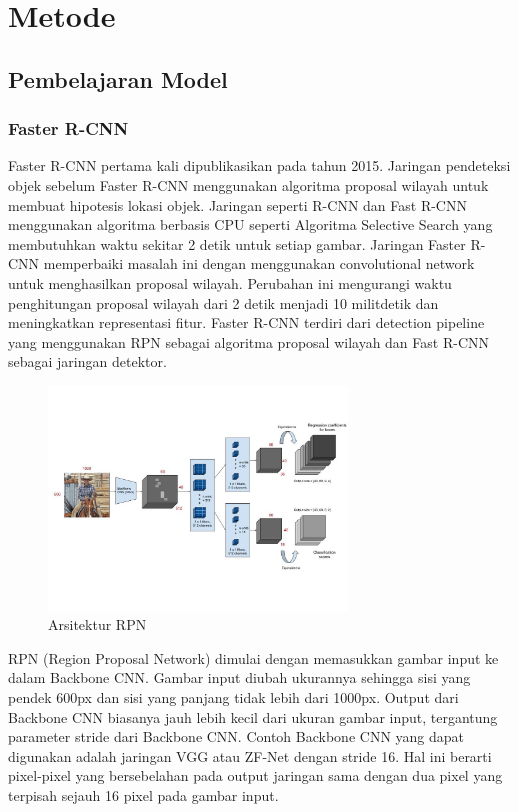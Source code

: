 \documentclass{article}
\begin{document}
  \section{Metode}
  	\subsection{Pembelajaran Model}
  	 \subsubsection{Faster R-CNN}
  	 \par Faster R-CNN pertama kali dipublikasikan pada tahun 2015. Jaringan pendeteksi objek sebelum Faster R-CNN menggunakan algoritma proposal wilayah untuk membuat hipotesis lokasi objek. Jaringan seperti R-CNN dan Fast R-CNN menggunakan algoritma berbasis CPU seperti Algoritma Selective Search yang membutuhkan waktu sekitar 2 detik untuk setiap gambar. Jaringan Faster R-CNN memperbaiki masalah ini dengan menggunakan convolutional network untuk menghasilkan proposal wilayah. Perubahan ini mengurangi waktu penghitungan proposal wilayah dari 2 detik menjadi 10 militdetik dan meningkatkan representasi fitur. Faster R-CNN terdiri dari detection pipeline yang menggunakan RPN sebagai algoritma proposal wilayah dan Fast R-CNN sebagai jaringan detektor.\cite{shilpa_2020}
  	 
  	 \begin{figure}[H]
  	 	\centering
  	 	\includegraphics[width=300px]{arsitektur/RPN.jpeg}
  	 	\caption{Arsitektur RPN}
  	 \end{figure}
   
  	 \par RPN (Region Proposal Network) dimulai dengan memasukkan gambar input ke dalam Backbone CNN. Gambar input diubah ukurannya sehingga sisi yang pendek 600px dan sisi yang panjang tidak lebih dari 1000px. Output dari Backbone CNN biasanya jauh lebih kecil dari ukuran gambar input, tergantung parameter stride dari Backbone CNN. Contoh Backbone CNN yang dapat digunakan adalah jaringan VGG atau ZF-Net dengan stride 16. Hal ini berarti pixel-pixel yang bersebelahan pada output jaringan sama dengan dua pixel yang terpisah sejauh 16 pixel pada gambar input. 
  	 
\end{document}
